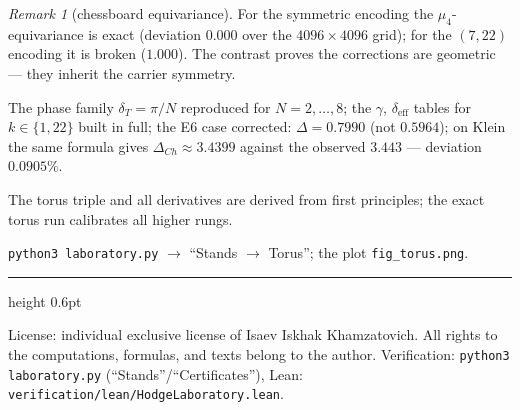 \documentclass[11pt,a4paper]{article}
\theoremstyle{plain}
\theoremstyle{definition}
\theoremstyle{remark}
\newtheorem{remark}[theorem]{Remark}
\begin{document}
\begin{remark}[chessboard equivariance]
For the symmetric encoding the $\mu_4$-equivariance is exact
(deviation $0.000$ over the $4096\times4096$ grid); for the $(7,22)$
encoding it is broken ($1.000$). The contrast proves the corrections
are geometric --- they inherit the carrier symmetry.
\end{remark}

\begin{databox}[numbers]
The phase family $\delta_T=\pi/N$ reproduced for $N=2,\dots,8$; the
$\gamma$, $\delta_{\mathrm{eff}}$ tables for $k\in\{1,22\}$ built in
full; the E6 case corrected: $\Delta=0.7990$ (not $0.5964$); on
Klein the same formula gives $\Delta_{Ch}\approx3.4399$ against the
observed $3.443$ --- deviation $0.0905\%$.
\end{databox}

\begin{statusbox}[summary]
The torus triple and all derivatives are derived from first
principles; the exact torus run calibrates all higher rungs.
\end{statusbox}

\begin{verifybox}[reproduction]
\texttt{python3 laboratory.py} $\to$ ``Stands $\to$ Torus''; the
plot \texttt{fig\_torus.png}.
\end{verifybox}

\vfill
{\color{linkblue}\hrule height 0.6pt}
\vspace{0.5em}
{\small\color{gray}
License: individual exclusive license of Isaev Iskhak Khamzatovich.
All rights to the computations, formulas, and texts belong to the author.
Verification: \texttt{python3 laboratory.py} (``Stands''/``Certificates''),
Lean: \texttt{verification/lean/HodgeLaboratory.lean}.
}
\end{document}

